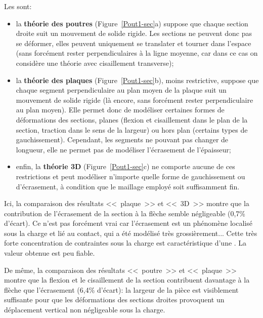 \medskip
Les  sont:
\begin{itemize}
\item la \textbf{théorie des poutres} (Figure~\ref{Pout1-sec}a) suppose que chaque section droite suit un mouvement de solide rigide. Les sections ne peuvent donc pas se déformer, elles peuvent uniquement se translater et tourner dans l'espace (sans forcément rester perpendiculaires à la ligne moyenne, car dans ce cas on considère une théorie avec cisaillement transverse);
\item la \textbf{théorie des plaques} (Figure~\ref{Pout1-sec}b), moins restrictive, suppose que chaque segment perpendiculaire au plan moyen de la plaque suit un mouvement de solide rigide (là encore, sans forcément rester perpendiculaire au plan moyen). Elle permet donc de modéliser certaines formes de déformations des sections, planes (flexion et cisaillement dans le plan de la section, traction dans le sens de la largeur) ou hors plan (certains types de gauchissement). Cependant, les segments ne pouvant pas changer de longueur, elle ne permet pas de modéliser l'écrasement de l'épaisseur;
\item enfin, la \textbf{théorie 3D} (Figure~\ref{Pout1-sec}c) ne comporte aucune de ces restrictions et peut modéliser n'importe quelle forme de gauchissement ou d'écrasement, à condition que le maillage employé soit suffisamment fin.
\end{itemize}

\medskip
Ici, la comparaison des résultats <<~plaque~>> et <<~3D~>> montre que la contribution de
l'écrasement de la section à la flèche semble négligeable (0,7\% d'écart).
Ce n'est pas forcément vrai car l'écrasement est un phénomène localisé sous la charge
et lié au contact, qui a été modélisé très grossièrement...
Cette très forte concentration de contraintes sous la charge est caractéristique d'une
. La valeur obtenue est peu fiable.

De même, la comparaison des résultats <<~poutre~>> et <<~plaque~>> montre que la flexion et le
cisaillement de la section contribuent davantage à la flèche que l'écrasement (6,4\% d'écart):
la largeur de la pièce est visiblement suffisante pour que les déformations des sections droites
provoquent un déplacement vertical non négligeable sous la charge.

